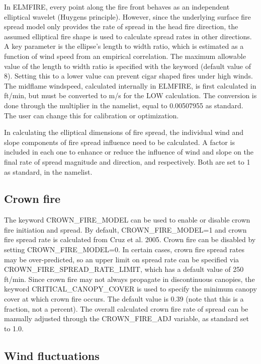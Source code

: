 In ELMFIRE, every point along the fire front behaves as an independent elliptical wavelet (Huygens principle). However, since the underlying surface fire spread model only provides the rate of spread in the head fire direction, the assumed elliptical fire shape is used to calculate spread rates in other directions. A key parameter is the ellipse’s length to width ratio, which is estimated as a function of wind speed from an empirical correlation. The maximum allowable value of the length to width ratio is specified with the keyword  (default value of 8). Setting this to a lower value can prevent cigar shaped fires under high winds. The midflame windspeed, calculated internally in ELMFIRE, is first calculated in ft/min, but must be converted to m/s for the LOW calculation. The conversion is done through the  multiplier in the  namelist, equal to 0.00507955 as standard. The user can change this for calibration or optimization.

In calculating the elliptical dimensions of fire spread, the individual wind and slope components of fire spread influence need to be calculated. A factor is included in each one to enhance or reduce the influence of wind and slope on the final rate of spread magnitude and direction,  and  respectively. Both are set to 1 as standard, in the  namelist. 

\subsection{Crown fire}
\label{crown_fire}
The keyword CROWN\_FIRE\_MODEL can be used to enable or disable crown fire initiation and spread. By default, CROWN\_FIRE\_MODEL=1 and crown fire spread rate is calculated from Cruz et al. 2005. Crown fire can be disabled by setting CROWN\_FIRE\_MODEL=0. In certain cases, crown fire spread rates may be over-predicted, so an upper limit on spread rate can be specified via CROWN\_FIRE\_SPREAD\_RATE\_LIMIT, which has a default value of 250 ft/min. Since crown fire may not always propagate in discontinuous canopies, the keyword CRITICAL\_CANOPY\_COVER is used to specify the minimum canopy cover at which crown fire occurs. The default value is 0.39 (note that this is a fraction, not a percent). The overall calculated crown fire rate of spread can be manually adjusted through the CROWN\_FIRE\_ADJ variable, as standard set to 1.0. 

\subsection{Wind fluctuations}
\label{wind_fluctuations}

